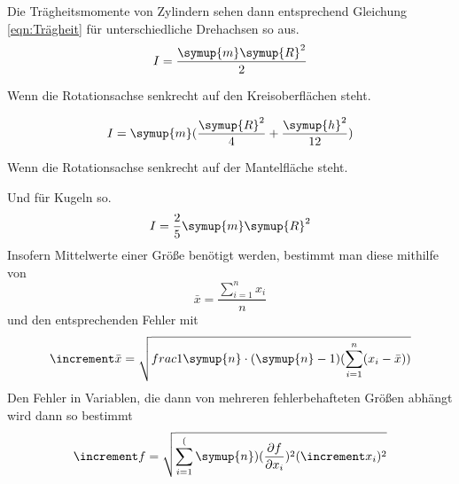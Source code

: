 Die Trägheitsmomente von Zylindern sehen dann entsprechend Gleichung \ref{eqn:Trägheit} für unterschiedliche
Drehachsen so aus.
\begin{equation}
    I=\frac{\symup{m}\symup{R}^2}{2} 
    \label{eqn:Trägheit_Zyl_1} 
\end{equation}
    \begin{center} 
    Wenn die Rotationsachse senkrecht auf den Kreisoberflächen steht.
    \end{center}
\begin{equation}
    I=\symup{m} (\frac{\symup{R}^2}{4}+\frac{\symup{h}^2}{12}) 
    \label{eqn:Trägheit_Zyl_2}  
\end{equation}
\begin{center}   
    Wenn die Rotationsachse senkrecht auf der Mantelfläche steht.
\end{center}

Und für Kugeln so.
\begin{equation}
    I=\frac{2}{5}\symup{m}\symup{R}^2
    \label{eqn:Trägheit_Kugel}
\end{equation}
Insofern Mittelwerte einer Größe benötigt werden, bestimmt man diese mithilfe von
\begin{equation}
    \bar{x}=\frac{\sum_{i=1}^n x_i}{n}
\end{equation}
und den entsprechenden Fehler mit
\begin{equation}
    \increment\bar{x}=\sqrt{frac{1}{\symup{n}\cdot(\symup{n}-1)}(\sum_{i=1}^n (x_i - \bar{x}))}
\end{equation}
Den Fehler in Variablen, die dann von mehreren fehlerbehafteten Größen abhängt wird dann so bestimmt
\begin{equation}
    \increment f=\sqrt{\sum_{i=1}^(\symup{n}) (\frac{\partial f}{\partial x_i})^2 (\increment x_i)^2}
\end{equation}
\cite{sample}
